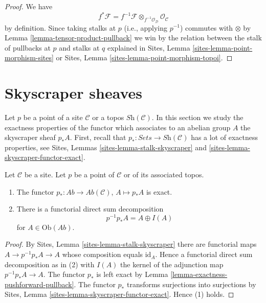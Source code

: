 \begin{proof}
We have
$$
f^*\mathcal{F} =
f^{-1}\mathcal{F} \otimes_{f^{-1}\mathcal{O}_{\mathcal{D}}}
\mathcal{O}_{\mathcal{C}}
$$
by definition. Since taking stalks at $p$ (i.e., applying
$p^{-1}$) commutes with $\otimes$ by
Lemma \ref{lemma-tensor-product-pullback}
we win by the relation between the stalk of pullbacks at $p$
and stalks at $q$ explained in
Sites, Lemma \ref{sites-lemma-point-morphism-sites} or
Sites, Lemma \ref{sites-lemma-point-morphism-topoi}.
\end{proof}






\section{Skyscraper sheaves}
\label{section-skyscraper}

\noindent
Let $p$ be a point of a site $\mathcal{C}$ or a topos
$\textit{Sh}(\mathcal{C})$. In this section we study the exactness
properties of the functor which associates to an abelian group $A$
the skyscraper sheaf $p_*A$. First, recall that
$p_* : \textit{Sets} \to \textit{Sh}(\mathcal{C})$ has a lot
of exactness properties, see
Sites, Lemmas \ref{sites-lemma-stalk-skyscraper} and
\ref{sites-lemma-skyscraper-functor-exact}.

\begin{lemma}
\label{lemma-skyscraper-exact}
Let $\mathcal{C}$ be a site. Let $p$ be a point of
$\mathcal{C}$ or of its associated topos.
\begin{enumerate}
\item The functor $p_* : \textit{Ab} \to \textit{Ab}(\mathcal{C})$,
$A \mapsto p_*A$ is exact.
\item There is a functorial direct sum decomposition
$$
p^{-1}p_*A = A \oplus I(A)
$$
for $A \in \text{Ob}(\textit{Ab})$.
\end{enumerate}
\end{lemma}

\begin{proof}
By
Sites, Lemma \ref{sites-lemma-stalk-skyscraper}
there are functorial maps $A \to p^{-1}p_*A \to A$ whose composition
equals $\text{id}_A$. Hence a functorial direct sum decomposition
as in (2) with $I(A)$ the kernel of the adjunction map
$p^{-1}p_*A \to A$. The functor $p_*$ is left exact by
Lemma \ref{lemma-exactness-pushforward-pullback}.
The functor $p_*$ transforms surjections into surjections by
Sites, Lemma \ref{sites-lemma-skyscraper-functor-exact}.
Hence (1) holds.
\end{proof}

